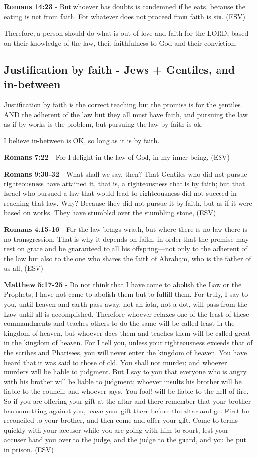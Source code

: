 \documentclass[11pt]{article}
\begin{document}
\textbf{Romans 14:23} - But whoever has doubts is condemned if he eats, because the eating is not from faith. For whatever does not proceed from faith is sin. (ESV)

Therefore, a person should do what is out of love and faith for the LORD, based on their knowledge of the law,
their faithfulness to God and their conviction.

\subsection{Justification by faith - Jews + Gentiles, and in-between}
\label{sec:org87b2e89}
Justification by faith is the correct teaching but the promise is for the gentiles AND the adherent of the law but they all must have faith, and pursuing the law as if by works is the problem, but pursuing the law by faith is ok.

I believe in-between is OK, so long as it is by faith.

\textbf{Romans 7:22} - For I delight in the law of God, in my inner being, (ESV)

\textbf{Romans 9:30-32} - What shall we say, then? That Gentiles who did not pursue righteousness have attained it, that is, a righteousness that is by faith; but that Israel who pursued a law that would lead to righteousness did not succeed in reaching that law. Why? Because they did not pursue it by faith, but as if it were based on works. They have stumbled over the stumbling stone, (ESV)

\textbf{Romans 4:15-16} - For the law brings wrath, but where there is no law there is no transgression. That is why it depends on faith, in order that the promise may rest on grace and be guaranteed to all his offspring—not only to the adherent of the law but also to the one who shares the faith of Abraham, who is the father of us all, (ESV)

\textbf{Matthew 5:17-25} - Do not think that I have come to abolish the Law or the Prophets; I have not come to abolish them but to fulfill them. For truly, I say to you, until heaven and earth pass away, not an iota, not a dot, will pass from the Law until all is accomplished. Therefore whoever relaxes one of the least of these commandments and teaches others to do the same will be called least in the kingdom of heaven, but whoever does them and teaches them will be called great in the kingdom of heaven. For I tell you, unless your righteousness exceeds that of the scribes and Pharisees, you will never enter the kingdom of heaven. You have heard that it was said to those of old, You shall not murder; and whoever murders will be liable to judgment. But I say to you that everyone who is angry with his brother will be liable to judgment; whoever insults his brother will be liable to the council; and whoever says, You fool! will be liable to the hell of fire. So if you are offering your gift at the altar and there remember that your brother has something against you, leave your gift there before the altar and go. First be reconciled to your brother, and then come and offer your gift. Come to terms quickly with your accuser while you are going with him to court, lest your accuser hand you over to the judge, and the judge to the guard, and you be put in prison. (ESV)
\end{document}
